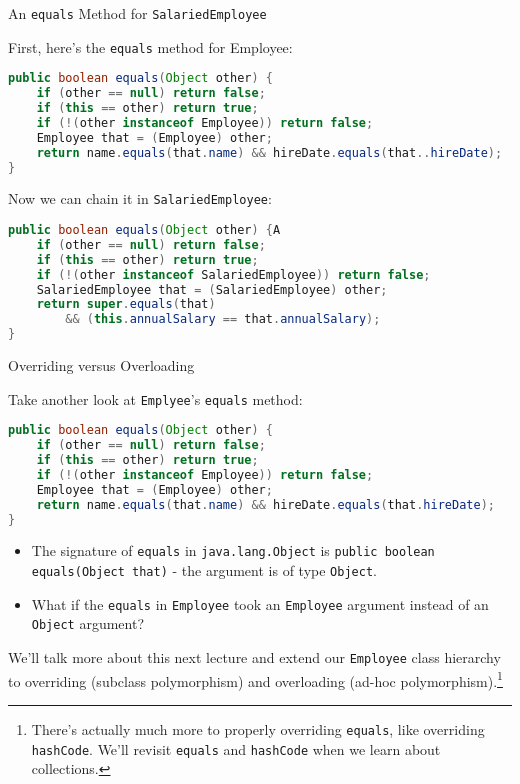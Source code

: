 \documentclass{beamer}
\begin{document}
\begin{frame}[fragile]{An {\tt equals} Method for {\tt SalariedEmployee}}


First, here's the {\tt equals} method for Employee:
\begin{lstlisting}[language=Java]
public boolean equals(Object other) {
    if (other == null) return false;
    if (this == other) return true;
    if (!(other instanceof Employee)) return false;
    Employee that = (Employee) other;
    return name.equals(that.name) && hireDate.equals(that..hireDate);
}
\end{lstlisting}

Now we can chain it in {\tt SalariedEmployee}:
\begin{lstlisting}[language=Java]
public boolean equals(Object other) {A
    if (other == null) return false;
    if (this == other) return true;
    if (!(other instanceof SalariedEmployee)) return false;
    SalariedEmployee that = (SalariedEmployee) other;
    return super.equals(that) 
        && (this.annualSalary == that.annualSalary);
}
\end{lstlisting}

\end{frame}

\begin{frame}[fragile]{Overriding versus Overloading}

\vspace{-.05in}
Take another look at {\tt Emplyee}'s {\tt equals} method:
\vspace{-.1in}
\begin{lstlisting}[language=Java]
public boolean equals(Object other) {
    if (other == null) return false;
    if (this == other) return true;
    if (!(other instanceof Employee)) return false;
    Employee that = (Employee) other;
    return name.equals(that.name) && hireDate.equals(that.hireDate);
}
\end{lstlisting}
\vspace{-.1in}
\begin{itemize}
\item The signature of {\tt equals} in {\tt java.lang.Object} is {\tt public boolean equals(Object that)} - the argument is of type {\tt Object}.
\item What if the {\tt equals} in {\tt Employee} took an {\tt Employee} argument instead of an {\tt Object} argument?
\end{itemize}

We'll talk more about this next lecture and extend our {\tt Employee} class hierarchy to overriding (subclass polymorphism) and overloading (ad-hoc polymorphism).\footnote{There's actually much more to properly overriding {\tt equals}, like overriding {\tt hashCode}.  We'll revisit {\tt equals} and {\tt hashCode} when we learn about collections.}
\end{frame}
\end{document}
